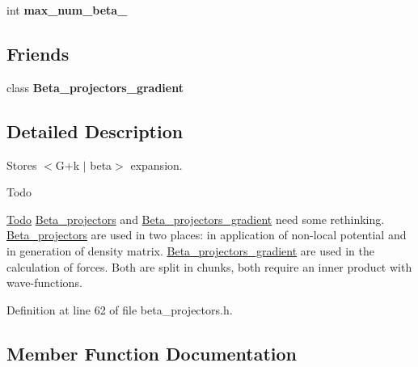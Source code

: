 \begin{DoxyCompactItemize}
\item 
\hypertarget{classsirius_1_1_beta__projectors_a6040c03c977b0b573f3aa63321ae55c5}{}int {\bfseries max\+\_\+num\+\_\+beta\+\_\+}\label{classsirius_1_1_beta__projectors_a6040c03c977b0b573f3aa63321ae55c5}

\end{DoxyCompactItemize}
\subsection*{Friends}
\begin{DoxyCompactItemize}
\item 
\hypertarget{classsirius_1_1_beta__projectors_ab98c40b88de07267e5459a7e04a8f7fd}{}class {\bfseries Beta\+\_\+projectors\+\_\+gradient}\label{classsirius_1_1_beta__projectors_ab98c40b88de07267e5459a7e04a8f7fd}

\end{DoxyCompactItemize}


\subsection{Detailed Description}
Stores $<$G+k $\vert$ beta$>$ expansion. 

\begin{DoxyRefDesc}{Todo}
\item[\hyperlink{todo__todo000001}{Todo}]\hyperlink{classsirius_1_1_beta__projectors}{Beta\+\_\+projectors} and \hyperlink{classsirius_1_1_beta__projectors__gradient}{Beta\+\_\+projectors\+\_\+gradient} need some rethinking. \hyperlink{classsirius_1_1_beta__projectors}{Beta\+\_\+projectors} are used in two places\+: in application of non-\/local potential and in generation of density matrix. \hyperlink{classsirius_1_1_beta__projectors__gradient}{Beta\+\_\+projectors\+\_\+gradient} are used in the calculation of forces. Both are split in chunks, both require an inner product with wave-\/functions. \end{DoxyRefDesc}


Definition at line 62 of file beta\+\_\+projectors.\+h.



\subsection{Member Function Documentation}
\hypertarget{classsirius_1_1_beta__projectors_a93230d7b8932ab6f6b809f7d6cbc6737}{}
